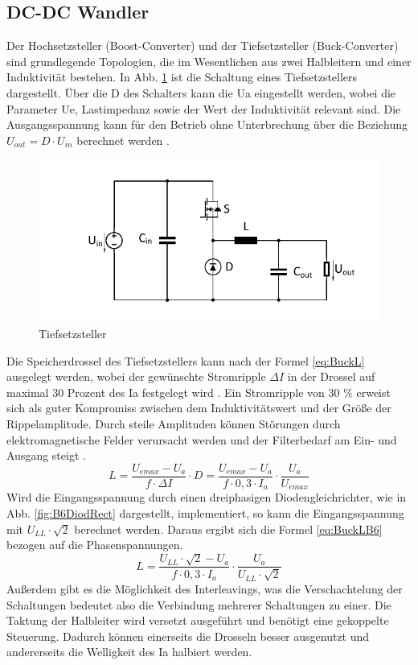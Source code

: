 		\subsection{DC-DC Wandler} \label{sec:Buck}
		Der Hochsetzsteller (Boost-Converter) und der Tiefsetzsteller (Buck-Converter) sind grundlegende Topologien, die im Wesentlichen aus zwei Halbleitern und einer Induktivität bestehen. In Abb. \ref{fig:buck} ist die Schaltung eines Tiefsetzstellers dargestellt. Über die \gls{D} des Schalters kann die \gls{Ua} eingestellt werden, wobei die Parameter \gls{Ue}, Lastimpedanz sowie der Wert der Induktivität relevant sind. Die Ausgangsspannung kann für den Betrieb ohne Unterbrechung über die Beziehung $U_{out}=D\cdot U_{in} $ berechnet werden \cite{schmidtwalter}.
		\begin{figure}
			\centering
			\includegraphics[width=0.9\linewidth]{content/Grafiken/Buck}
			\caption[Tiefsetzsteller]{Tiefsetzsteller}
			\label{fig:buck}
		\end{figure}
		Die Speicherdrossel des Tiefsetzstellers kann nach der Formel \ref{eq:BuckL} ausgelegt werden, wobei der gewünschte Stromripple $\Delta I $ in der Drossel auf maximal 30 Prozent des \gls{Ia} festgelegt wird \cite{schmidtwalter}. Ein Stromripple von 30 \% erweist sich als guter Kompromiss zwischen dem Induktivitätswert und der Größe der Rippelamplitude. Durch steile Amplituden können Störungen durch elektromagnetische Felder verursacht werden und der Filterbedarf am Ein- und Ausgang steigt \cite{AnalogInductor} \cite{TIBuck}.
		\begin{equation}
			\label{eq:BuckL}
			L=\dfrac{U_{emax}-U_{a}}{f\cdot \Delta I}\cdot D = \dfrac{U_{emax}-U_{a}}{f\cdot 0,3 \cdot I_{a}}\cdot \dfrac{U_{a}}{U_{emax}}
		\end{equation}
		Wird die Eingangsspannung durch einen dreiphasigen Diodengleichrichter, wie in Abb. \ref{fig:B6DiodRect} dargestellt,  implementiert, so kann die Eingangsspannung mit $U_{LL} \cdot \sqrt{2}$ berechnet werden. Daraus ergibt sich die Formel \ref{eq:BuckLB6} bezogen auf die Phasenspannungen. \\
		\begin{equation}
			\label{eq:BuckLB6}
			L=\dfrac{U_{LL} \cdot \sqrt{2}-U_{a}}{f\cdot 0,3 \cdot I_{a}}\cdot \dfrac{U_{a}}{U_{LL} \cdot \sqrt{2}}
		\end{equation}
		Außerdem gibt es die Möglichkeit des Interleavings, was die Verschachtelung der Schaltungen bedeutet also die Verbindung mehrerer Schaltungen zu einer. Die Taktung der Halbleiter wird versetzt ausgeführt und benötigt eine gekoppelte Steuerung. Dadurch können einerseits die Drosseln besser ausgenutzt und andererseits die Welligkeit des \gls{Ia} halbiert werden. 
		
